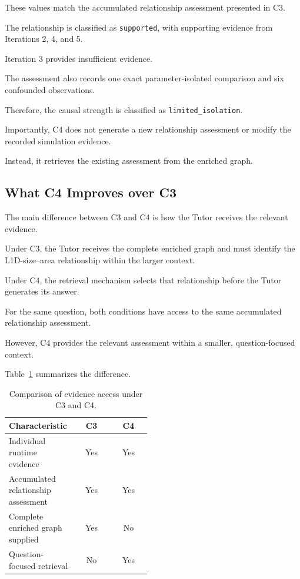These values match the
accumulated relationship
assessment presented in C3.

The relationship is classified
as \texttt{supported}, with
supporting evidence from
Iterations 2, 4, and 5.

Iteration 3 provides
insufficient evidence.

The assessment also records
one exact parameter-isolated
comparison and six
confounded observations.

Therefore, the causal
strength is classified as
\texttt{limited\_isolation}.

Importantly, C4 does not
generate a new relationship
assessment or modify the
recorded simulation evidence.

Instead, it retrieves
the existing assessment
from the enriched graph.


\subsection{What C4 Improves over C3}

The main difference between
C3 and C4 is how the Tutor
receives the relevant evidence.

Under C3, the Tutor receives
the complete enriched graph
and must identify the
L1D-size--area relationship
within the larger context.

Under C4, the retrieval
mechanism selects that
relationship before the
Tutor generates its answer.

For the same question,
both conditions have access
to the same accumulated
relationship assessment.

However, C4 provides
the relevant assessment
within a smaller,
question-focused context.

Table~\ref{tab:app_p5_c3_c4_comparison}
summarizes the difference.

\begin{table}[htbp]
\centering
\caption{Comparison of evidence access
under C3 and C4.}
\label{tab:app_p5_c3_c4_comparison}

\renewcommand{\arraystretch}{1.2}
\small
\setlength{\tabcolsep}{5pt}

\begin{tabular}{p{0.48\linewidth}cc}
\toprule
\textbf{Characteristic} &
\textbf{C3} &
\textbf{C4} \\
\midrule

Individual runtime evidence &
Yes & Yes \\

Accumulated relationship assessment &
Yes & Yes \\

Complete enriched graph supplied &
Yes & No \\

Question-focused retrieval &
No & Yes \\

\bottomrule
\end{tabular}
\end{table}

